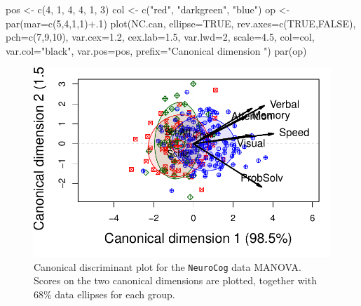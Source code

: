 \documentclass[
  letterpaper,
  10pt,
  krantz2]{krantz}
\makeatletter
\newenvironment{Shaded}{\begin{snugshade}}{\end{snugshade}}
\newcommand{\AttributeTok}[1]{\textcolor[rgb]{0.40,0.45,0.13}{#1}}
\newcommand{\ConstantTok}[1]{\textcolor[rgb]{0.56,0.35,0.01}{#1}}
\newcommand{\DecValTok}[1]{\textcolor[rgb]{0.68,0.00,0.00}{#1}}
\newcommand{\FloatTok}[1]{\textcolor[rgb]{0.68,0.00,0.00}{#1}}
\newcommand{\FunctionTok}[1]{\textcolor[rgb]{0.28,0.35,0.67}{#1}}
\newcommand{\NormalTok}[1]{\textcolor[rgb]{0.00,0.23,0.31}{#1}}
\newcommand{\OtherTok}[1]{\textcolor[rgb]{0.00,0.23,0.31}{#1}}
\newcommand{\SpecialCharTok}[1]{\textcolor[rgb]{0.37,0.37,0.37}{#1}}
\newcommand{\StringTok}[1]{\textcolor[rgb]{0.13,0.47,0.30}{#1}}
\newenvironment{kframe}{%
  \medskip{}
  \setlength{\fboxsep}{.8em}
  \def\at@end@of@kframe{}%
  \ifinner\ifhmode%
  \def\at@end@of@kframe{\end{minipage}}%
  \begin{minipage}{\columnwidth}%
  \fi\fi%
  \def\FrameCommand##1{\hskip\@totalleftmargin \hskip-\fboxsep
  \colorbox{shadecolor}{##1}\hskip-\fboxsep
      \hskip-\linewidth \hskip-\@totalleftmargin \hskip\columnwidth}%
  \MakeFramed {\advance\hsize-\width
    \@totalleftmargin\z@ \linewidth\hsize
    \@setminipage}}%
{\par\unskip\endMakeFramed%
  \at@end@of@kframe}
\renewenvironment{Shaded}{\begin{kframe}}{\end{kframe}}
\makeatother
\begin{document}
\begin{Shaded}
\begin{Highlighting}[]
\NormalTok{pos }\OtherTok{\textless{}{-}} \FunctionTok{c}\NormalTok{(}\DecValTok{4}\NormalTok{, }\DecValTok{1}\NormalTok{, }\DecValTok{4}\NormalTok{, }\DecValTok{4}\NormalTok{, }\DecValTok{1}\NormalTok{, }\DecValTok{3}\NormalTok{)}
\NormalTok{col }\OtherTok{\textless{}{-}} \FunctionTok{c}\NormalTok{(}\StringTok{"red"}\NormalTok{, }\StringTok{"darkgreen"}\NormalTok{, }\StringTok{"blue"}\NormalTok{)}
\NormalTok{op }\OtherTok{\textless{}{-}} \FunctionTok{par}\NormalTok{(}\AttributeTok{mar=}\FunctionTok{c}\NormalTok{(}\DecValTok{5}\NormalTok{,}\DecValTok{4}\NormalTok{,}\DecValTok{1}\NormalTok{,}\DecValTok{1}\NormalTok{)}\SpecialCharTok{+}\NormalTok{.}\DecValTok{1}\NormalTok{)}
\FunctionTok{plot}\NormalTok{(NC.can, }
     \AttributeTok{ellipse=}\ConstantTok{TRUE}\NormalTok{, }
     \AttributeTok{rev.axes=}\FunctionTok{c}\NormalTok{(}\ConstantTok{TRUE}\NormalTok{,}\ConstantTok{FALSE}\NormalTok{), }
     \AttributeTok{pch=}\FunctionTok{c}\NormalTok{(}\DecValTok{7}\NormalTok{,}\DecValTok{9}\NormalTok{,}\DecValTok{10}\NormalTok{),}
     \AttributeTok{var.cex=}\FloatTok{1.2}\NormalTok{, }\AttributeTok{cex.lab=}\FloatTok{1.5}\NormalTok{, }\AttributeTok{var.lwd=}\DecValTok{2}\NormalTok{,  }\AttributeTok{scale=}\FloatTok{4.5}\NormalTok{, }
     \AttributeTok{col=}\NormalTok{col,}
       \AttributeTok{var.col=}\StringTok{"black"}\NormalTok{, }\AttributeTok{var.pos=}\NormalTok{pos,}
     \AttributeTok{prefix=}\StringTok{"Canonical dimension "}\NormalTok{)}
\FunctionTok{par}\NormalTok{(op)}
\end{Highlighting}
\end{Shaded}

\begin{figure}[H]

{\centering \includegraphics[width=1\textwidth,height=\textheight]{figs/fig-NC-candisc-1.pdf}

}

\caption{\label{fig-NC-candisc}Canonical discriminant plot for the
\texttt{NeuroCog} data MANOVA. Scores on the two canonical dimensions
are plotted, together with 68\% data ellipses for each group.}

\end{figure}
\end{document}

